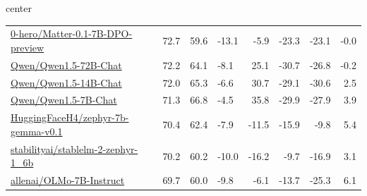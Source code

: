 {\begin{table}[t]
\begin{adjustbox}{center}
\begin{tabular}{lrr|l|rrrr}
\href{https://huggingface.co/0-hero/Matter-0.1-7B-DPO-preview}{0-hero/Matter-0.1-7B-DPO-preview} & 72.7 & 59.6 & \cellcolor{red!13} -13.1 & \cellcolor{red!6} -5.9 & \cellcolor{red!23} -23.3 & \cellcolor{red!23} -23.1 & \cellcolor{red!0} -0.0 \\
\href{https://huggingface.co/Qwen/Qwen1.5-72B-Chat}{Qwen/Qwen1.5-72B-Chat} & 72.2 & 64.1 & \cellcolor{red!8} -8.1 & \cellcolor{blue!25} 25.1 & \cellcolor{red!31} -30.7 & \cellcolor{red!27} -26.8 & \cellcolor{red!0} -0.2 \\
\href{https://huggingface.co/Qwen/Qwen1.5-14B-Chat}{Qwen/Qwen1.5-14B-Chat} & 72.0 & 65.3 & \cellcolor{red!7} -6.6 & \cellcolor{blue!31} 30.7 & \cellcolor{red!29} -29.1 & \cellcolor{red!31} -30.6 & \cellcolor{blue!2} 2.5 \\
\href{https://huggingface.co/Qwen/Qwen1.5-7B-Chat}{Qwen/Qwen1.5-7B-Chat} & 71.3 & 66.8 & \cellcolor{red!4} -4.5 & \cellcolor{blue!36} 35.8 & \cellcolor{red!30} -29.9 & \cellcolor{red!28} -27.9 & \cellcolor{blue!4} 3.9 \\
\href{https://huggingface.co/HuggingFaceH4/zephyr-7b-gemma-v0.1}{HuggingFaceH4/zephyr-7b-gemma-v0.1} & 70.4 & 62.4 & \cellcolor{red!8} -7.9 & \cellcolor{red!12} -11.5 & \cellcolor{red!16} -15.9 & \cellcolor{red!10} -9.8 & \cellcolor{blue!5} 5.4 \\
\href{https://huggingface.co/stabilityai/stablelm-2-zephyr-1_6b}{stabilityai/stablelm-2-zephyr-1\_6b} & 70.2 & 60.2 & \cellcolor{red!10} -10.0 & \cellcolor{red!16} -16.2 & \cellcolor{red!10} -9.7 & \cellcolor{red!17} -16.9 & \cellcolor{blue!3} 3.1 \\
\href{https://huggingface.co/allenai/OLMo-7B-Instruct}{allenai/OLMo-7B-Instruct} & 69.7 & 60.0 & \cellcolor{red!10} -9.8 & \cellcolor{red!6} -6.1 & \cellcolor{red!14} -13.7 & \cellcolor{red!25} -25.3 & \cellcolor{blue!6} 6.1 \\

\end{tabular}
\end{adjustbox}
\end{table}}

